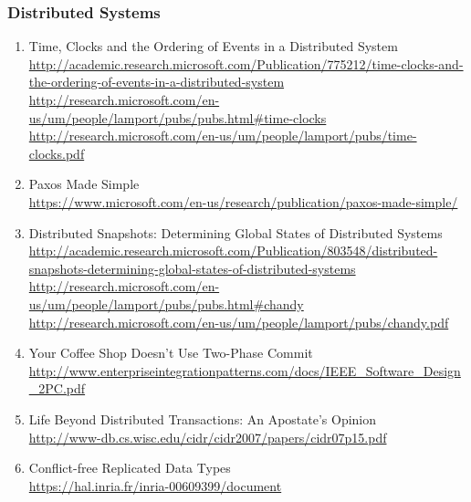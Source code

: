 \documentclass{article}
\begin{document}
\subsubsection{Distributed Systems}
\begin{enumerate}
	\item {Time, Clocks and the Ordering of Events in a Distributed System\\		
\href{http://academic.research.microsoft.com/Publication/775212/time-clocks-and-the-ordering-of-events-in-a-distributed-system}{http://academic.research.microsoft.com/Publication/775212/time-clocks-and-the-ordering-of-events-in-a-distributed-system}\\
\href{http://research.microsoft.com/en-us/um/people/lamport/pubs/pubs.html#time-clocks}{http://research.microsoft.com/en-us/um/people/lamport/pubs/pubs.html\#time-clocks}\\
\href{http://research.microsoft.com/en-us/um/people/lamport/pubs/time-clocks.pdf}{http://research.microsoft.com/en-us/um/people/lamport/pubs/time-clocks.pdf}}
	\item {Paxos Made Simple\\
	\url{https://www.microsoft.com/en-us/research/publication/paxos-made-simple/}}
	\item {Distributed Snapshots: Determining Global States of Distributed Systems\\
\href{http://academic.research.microsoft.com/Publication/803548/distributed-snapshots-determining-global-states-of-distributed-systems}{http://academic.research.microsoft.com/Publication/803548/distributed-snapshots-determining-global-states-of-distributed-systems}\\
\href{http://research.microsoft.com/en-us/um/people/lamport/pubs/pubs.html#chandy}{http://research.microsoft.com/en-us/um/people/lamport/pubs/pubs.html\#chandy}\\
\href{http://research.microsoft.com/en-us/um/people/lamport/pubs/chandy.pdf}{http://research.microsoft.com/en-us/um/people/lamport/pubs/chandy.pdf}}
	\item {Your Coffee Shop Doesn’t Use Two-Phase Commit\\
\href{http://www.enterpriseintegrationpatterns.com/docs/IEEE_Software_Design_2PC.pdf}{http://www.enterpriseintegrationpatterns.com/docs/IEEE\_Software\_Design\_2PC.pdf}}
	\item {Life Beyond Distributed Transactions: An Apostate’s Opinion\\
\url{http://www-db.cs.wisc.edu/cidr/cidr2007/papers/cidr07p15.pdf}}
	\item {Conflict-free Replicated Data Types\\
\url{https://hal.inria.fr/inria-00609399/document}}
\end{enumerate}
\end{document}

